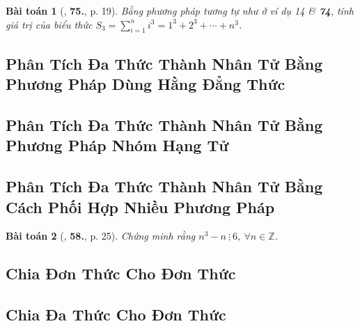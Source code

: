 \documentclass{article}
\numberwithin{equation}{section}
\newtheorem{baitoan}{Bài toán}[section]
\begin{document}
\begin{baitoan}[\cite{Binh_Toan_8_tap_1}, \textbf{75.}, p. 19]
	Bằng phương pháp tương tự như ở ví dụ 14 \& \textbf{74}, tính giá trị của biểu thức $S_3 = \sum_{i=1}^n i^3 = 1^3 + 2^3 + \cdots + n^3$.
\end{baitoan}


\subsection{Phân Tích Đa Thức Thành Nhân Tử Bằng Phương Pháp Dùng Hằng Đẳng Thức}


\subsection{Phân Tích Đa Thức Thành Nhân Tử Bằng Phương Pháp Nhóm Hạng Tử}


\subsection{Phân Tích Đa Thức Thành Nhân Tử Bằng Cách Phối Hợp Nhiều Phương Pháp}
\begin{baitoan}[\cite{SGK_Toan_8_tap_1}, \textbf{58.}, p. 25]
	Chứng minh rằng $n^3 - n\ \vdots\ 6$, $\forall n\in\mathbb{Z}$.
\end{baitoan}


\subsection{Chia Đơn Thức Cho Đơn Thức}


\subsection{Chia Đa Thức Cho Đơn Thức}

\end{document}
